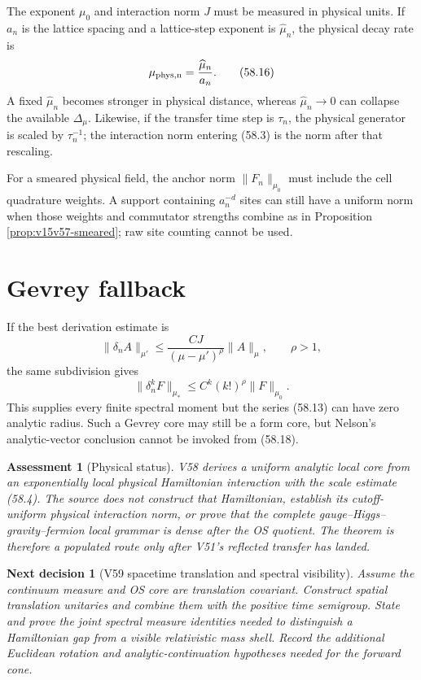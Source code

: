\documentclass[11pt]{article}
\newtheorem{decision}[theorem]{Next decision}
\newtheorem{assessment}[theorem]{Assessment}
\theoremstyle{remark}
\begin{document}
The exponent \(\mu_0\) and interaction norm \(J\) must be measured in
physical units.  If \(a_n\) is the lattice spacing and a lattice-step
exponent is \(\widehat\mu_n\), the physical decay rate is
\[
 \mu_{\rm phys,n}=\frac{\widehat\mu_n}{a_n}.             \tag{58.16}
\]
A fixed \(\widehat\mu_n\) becomes stronger in physical distance,
whereas \(\widehat\mu_n\to0\) can collapse the available
\(\Delta_\mu\).  Likewise, if the transfer time step is
\(\tau_n\), the physical generator is scaled by \(\tau_n^{-1}\);
the interaction norm entering (58.3) is the norm after that
rescaling.

For a smeared physical field, the anchor norm
\(\|F_n\|_{\mu_0}\) must include the cell quadrature weights.  A
support containing \(a_n^{-d}\) sites can still have a uniform norm
when those weights and commutator strengths combine as in
Proposition \ref{prop:v15v57-smeared}; raw site counting cannot be
used.

\section{Gevrey fallback}

If the best derivation estimate is
\[
 \|\delta_nA\|_{\mu'}
 \leq
 \frac{CJ}{(\mu-\mu')^\rho}\|A\|_\mu,\qquad\rho>1,       \tag{58.17}
\]
the same subdivision gives
\[
 \|\delta_n^kF\|_{\mu_*}
 \leq C^k(k!)^\rho\|F\|_{\mu_0}.                        \tag{58.18}
\]
This supplies every finite spectral moment but the series (58.13)
can have zero analytic radius.  Such a Gevrey core may still be a
form core, but Nelson's analytic-vector conclusion cannot be invoked
from (58.18).

\begin{assessment}[Physical status]
\label{ass:v15v58-status}
V58 derives a uniform analytic local core from an exponentially
local physical Hamiltonian interaction with the scale estimate
(58.4).  The source does not construct that Hamiltonian, establish
its cutoff-uniform physical interaction norm, or prove that the
complete gauge--Higgs--gravity--fermion local grammar is dense after
the OS quotient.  The theorem is therefore a populated route only
after V51's reflected transfer has landed.
\end{assessment}

\begin{decision}[V59 spacetime translation and spectral visibility]
\label{dec:v15v58-next}
Assume the continuum measure and OS core are translation covariant.
Construct spatial translation unitaries and combine them with the
positive time semigroup.  State and prove the joint spectral
measure identities needed to distinguish a Hamiltonian gap from a
visible relativistic mass shell.  Record the additional Euclidean
rotation and analytic-continuation hypotheses needed for the
forward cone.
\end{decision}
\end{document}
